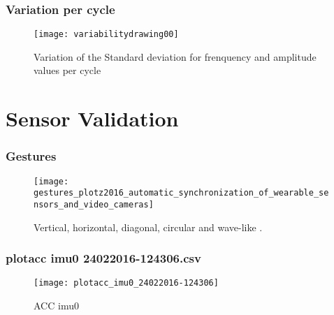 \documentclass{beamer}
\begin{document}
\begin{frame}
\frametitle{Variation per cycle}
\vspace{5mm}

\begin{figure}[!htb]
\centering    
\texttt{[image: variabilitydrawing00]}
\caption[PA]{Variation of the Standard deviation for frenquency and amplitude values per cycle}
\label{}
\end{figure}



\end{frame}



\section{Sensor Validation}
 
 
 
\begin{frame}
\frametitle{Gestures}
\vspace{-7mm}

\begin{figure}[!htb]
\centering    
\texttt{[image: gestures\_plotz2016\_automatic\_synchronization\_of\_wearable\_sensors\_and\_video\_cameras]}
\caption[PA]{Vertical, horizontal, diagonal, circular and wave-like  \textcolor{red}{\textbf{ \cite{Plotz2012} }}.}
\label{}
\end{figure}




\end{frame}
 
 

 
 
 
 
\begin{frame}
\frametitle{plotacc imu0 24022016-124306.csv}
\vspace{-7mm}

\begin{figure}[!htb]
\centering    
\texttt{[image: plotacc\_imu0\_24022016-124306]}
\caption[PA]{ACC imu0}
\label{}
\end{figure}

\end{frame}
 
\end{document}
